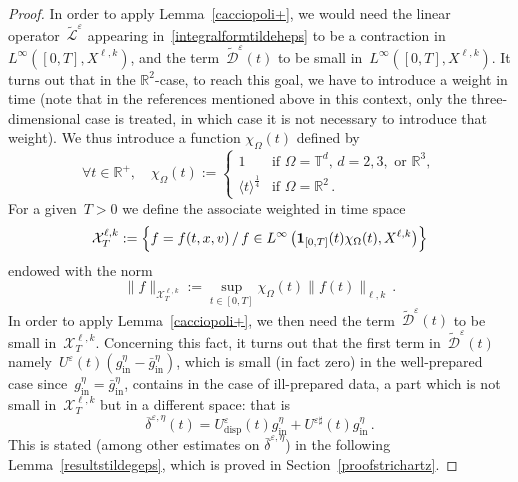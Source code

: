 \documentclass[11pt]{article}
\theoremstyle{definition}
\numberwithin{equation}{section}
\numberwithin{figure}{section}
\numberwithin{table}{section}
\newcommand*\R {\mathbb{R}}
\newcommand*\T {\mathbb{T}}
\newcommand*\eps{{\varepsilon}}
\newcommand*\e{{\varepsilon}}
\DeclareMathOperator{\inn}{in}
\DeclareMathOperator{\disp}{disp}
\let\oldforall\forall
\renewcommand*{\forall}{\mathrel{\oldforall}}
\begin{document}
\begin{proof}
In order to apply Lemma~\ref{cacciopoli+}, we would need the linear operator~$ \widetilde {\mathcal{L}}^{\e}$ appearing in~\eqref{integralformtildeheps} to be a contraction in~$L^\infty([0,T],X^{\ell,k})$, and the term~$\mathcal{\widetilde D}^{\eps}(t) $ to be small in~$L^\infty([0,T],X^{\ell,k})$. It turns out that in the $\R^2$-case, to reach this goal, we have to introduce a weight in time (note that in the references mentioned above in this context, only the three-dimensional case is treated, in which case it is not necessary to introduce that weight). We thus introduce a function $\chi_\Omega(t)$ defined by
\[
\forall t \in \R^+, \quad \chi_\Omega(t) :=
\begin{cases}
1 & \text{if } \Omega = \T^d, \, d = 2,3, \text{ or } \R^3, \\
\langle t \rangle^\frac14 &\text{if } \Omega = \R^2 \,.
\end{cases}
\]
For a given~$T>0 $ we define the associate weighted in time space
\[
\mathcal{X}_T^{\ell,k} := \Bigl\{f = f(t,x,v) \, / \, f\in L^\infty\left(\mathbf{1}_{[0,T]}(t)\chi_\Omega(t),X^{\ell,k}\right)
\Bigr\}
\]
endowed with the norm
\[
\|f\|_{\mathcal{X}_T^{\ell,k} }:= \sup_{t\in [0,T]}\chi_\Omega(t)\|f(t)\|_{\ell,k}\,.
\]
In order to apply Lemma~\ref{cacciopoli+}, we then need the term~$\mathcal{\widetilde D}^{\eps}(t) $ to be small in~$\mathcal{X}^{\ell,k}_T$. Concerning this fact, it turns out that the first term in~$ \mathcal{\widetilde D}^{\eps}(t) $ namely~$U^\eps (t) (g^\eta_{\inn} - \bar g^\eta_{\inn}) $, which is small (in fact zero) in the well-prepared case since~$g^\eta_{\inn} = \bar g^\eta_{\inn} $, contains in the case of ill-prepared data, a part which is not small in~${\mathcal X}_T^{{\ell},k}$ but in a different space: that is
\[
\overline\delta^{\eps,\eta}(t)=U^\eps_{\disp}(t) g^\eta_{\inn} + U^{\eps \sharp}(t)g^\eta_{\inn}\,.
\]
This is stated (among other estimates on $\bar \delta^{\eps,\eta}$) in the following Lemma~\ref{resultstildegeps}, which is proved in Section~\ref{proofstrichartz}.



\end{proof}
\end{document}
